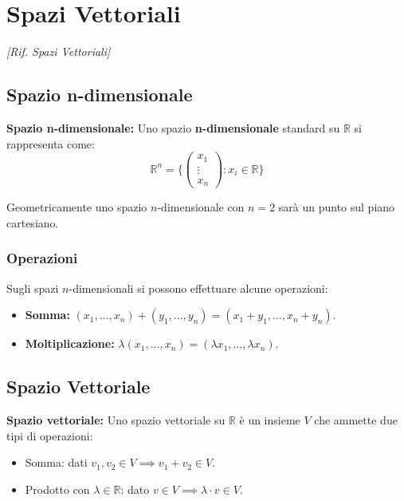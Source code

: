 \section{Spazi Vettoriali}
\emph{[Rif. Spazi Vettoriali]}

\subsection{Spazio n-dimensionale}
\begin{definitionbox}
\textbf{Spazio n-dimensionale:} Uno spazio \textbf{n-dimensionale} standard su $\mathbb{R}$ si rappresenta come:
$$ \mathbb{R}^n = \Bigg\{ \begin{pmatrix}x_1\\ \vdots \\ x_n\end{pmatrix} : x_i \in \mathbb{R} \Bigg\} $$
\end{definitionbox}
Geometricamente uno spazio $n$-dimensionale con $n=2$ sarà un punto sul piano cartesiano.

\subsubsection{Operazioni}
Sugli spazi $n$-dimensionali si possono effettuare alcune operazioni:
\begin{itemize}
    \item \textbf{Somma:} $(x_1, \dots, x_n) + (y_1, \dots, y_n) = (x_1 + y_1, \dots, x_n + y_n)$.
    \item \textbf{Moltiplicazione:} $\lambda(x_1, \dots, x_n) = (\lambda x_1, \dots, \lambda x_n)$.
\end{itemize}

\subsection{Spazio Vettoriale}
\begin{definitionbox}
\textbf{Spazio vettoriale:} Uno spazio vettoriale su $\mathbb{R}$ è un insieme $V$ che ammette due tipi di operazioni:
\begin{itemize}
    \item Somma: dati $v_1, v_2 \in V \implies v_1 + v_2 \in V$.
    \item Prodotto con $\lambda \in \mathbb{R}$: dato $v \in V \implies \lambda \cdot v \in V$.
\end{itemize}
\end{definitionbox}

